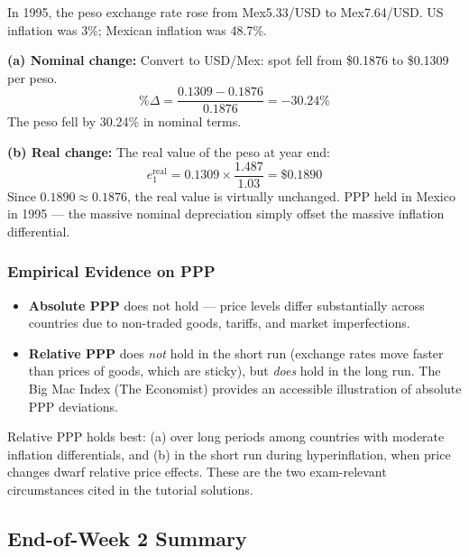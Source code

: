 \documentclass[11pt,a4paper]{article}
\begin{document}
In 1995, the peso exchange rate rose from Mex5.33/USD to Mex7.64/USD. US inflation was 3\%; Mexican inflation was 48.7\%.

\textbf{(a) Nominal change:} Convert to USD/Mex: spot fell from \$0.1876 to \$0.1309 per peso.
\[
  \%\Delta = \frac{0.1309 - 0.1876}{0.1876} = -30.24\%
\]
The peso fell by 30.24\% in nominal terms.

\textbf{(b) Real change:} The real value of the peso at year end:
\[
  e_1^{\text{real}} = 0.1309 \times \frac{1.487}{1.03} = \$0.1890
\]
Since $0.1890 \approx 0.1876$, the real value is virtually unchanged. PPP held in Mexico in 1995 --- the massive nominal depreciation simply offset the massive inflation differential.

\subsubsection{Empirical Evidence on PPP}

\begin{itemize}
  \item \textbf{Absolute PPP} does not hold --- price levels differ substantially across countries due to non-traded goods, tariffs, and market imperfections.
  \item \textbf{Relative PPP} does \textit{not} hold in the short run (exchange rates move faster than prices of goods, which are sticky), but \textit{does} hold in the long run. The Big Mac Index (The Economist) provides an accessible illustration of absolute PPP deviations.
\end{itemize}

\begin{tipbox}
Relative PPP holds best: (a) over long periods among countries with moderate inflation differentials, and (b) in the short run during hyperinflation, when price changes dwarf relative price effects. These are the two exam-relevant circumstances cited in the tutorial solutions.
\end{tipbox}

\subsection{End-of-Week 2 Summary}
\end{document}
